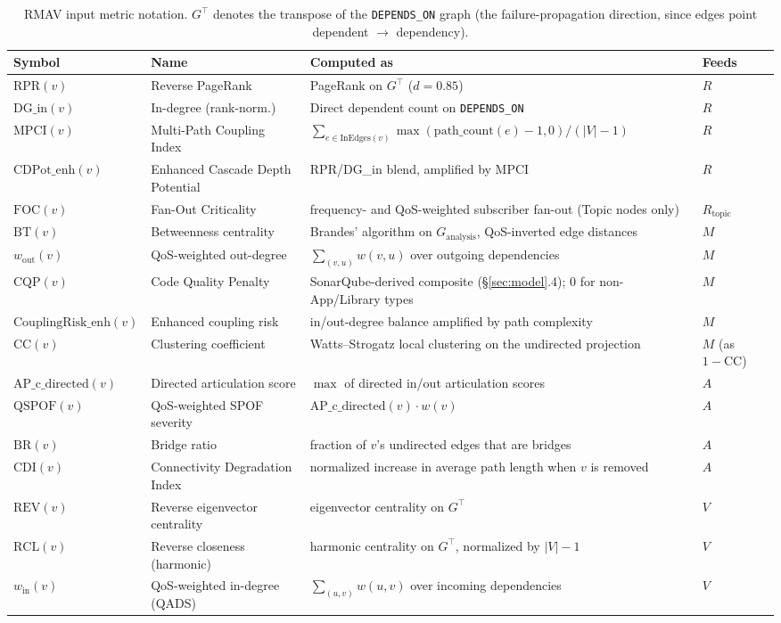 \documentclass[review]{elsarticle}
\begin{document}
\begin{table}[p]
\centering
\scriptsize
\caption{RMAV input metric notation. $G^\top$ denotes the transpose of the \texttt{DEPENDS\_ON}
graph (the failure-propagation direction, since edges point dependent $\to$ dependency).}
\label{tab:notation}
\begin{tabular}{@{}p{2.0cm}p{2.6cm}p{5.2cm}p{0.7cm}@{}}
\toprule
Symbol & Name & Computed as & Feeds \\
\midrule
$\mathrm{RPR}(v)$ & Reverse PageRank & PageRank on $G^\top$ ($d=0.85$) & $R$ \\
$\mathrm{DG\_in}(v)$ & In-degree (rank-norm.) & Direct dependent count on \texttt{DEPENDS\_ON} & $R$ \\
$\mathrm{MPCI}(v)$ & Multi-Path Coupling Index & $\sum_{e\in\text{InEdges}(v)} \max(\text{path\_count}(e)-1,0) / (|V|-1)$ & $R$ \\
$\mathrm{CDPot\_enh}(v)$ & Enhanced Cascade Depth Potential & RPR/DG\_in blend, amplified by MPCI & $R$ \\
$\mathrm{FOC}(v)$ & Fan-Out Criticality & frequency- and QoS-weighted subscriber fan-out (Topic nodes only) & $R_{\text{topic}}$ \\
$\mathrm{BT}(v)$ & Betweenness centrality & Brandes' algorithm on $G_{\text{analysis}}$, QoS-inverted edge distances & $M$ \\
$w_{\text{out}}(v)$ & QoS-weighted out-degree & $\sum_{(v,u)} w(v,u)$ over outgoing dependencies & $M$ \\
$\mathrm{CQP}(v)$ & Code Quality Penalty & SonarQube-derived composite (\S\ref{sec:model}.4); 0 for non-App/Library types & $M$ \\
$\mathrm{CouplingRisk\_enh}(v)$ & Enhanced coupling risk & in/out-degree balance amplified by path complexity & $M$ \\
$\mathrm{CC}(v)$ & Clustering coefficient & Watts--Strogatz local clustering on the undirected projection & $M$ (as $1-\mathrm{CC}$) \\
$\mathrm{AP\_c\_directed}(v)$ & Directed articulation score & $\max$ of directed in/out articulation scores & $A$ \\
$\mathrm{QSPOF}(v)$ & QoS-weighted SPOF severity & $\mathrm{AP\_c\_directed}(v)\cdot w(v)$ & $A$ \\
$\mathrm{BR}(v)$ & Bridge ratio & fraction of $v$'s undirected edges that are bridges & $A$ \\
$\mathrm{CDI}(v)$ & Connectivity Degradation Index & normalized increase in average path length when $v$ is removed & $A$ \\
$\mathrm{REV}(v)$ & Reverse eigenvector centrality & eigenvector centrality on $G^\top$ & $V$ \\
$\mathrm{RCL}(v)$ & Reverse closeness (harmonic) & harmonic centrality on $G^\top$, normalized by $|V|-1$ & $V$ \\
$w_{\text{in}}(v)$ & QoS-weighted in-degree (QADS) & $\sum_{(u,v)} w(u,v)$ over incoming dependencies & $V$ \\
\bottomrule
\end{tabular}
\end{table}
\end{document}
